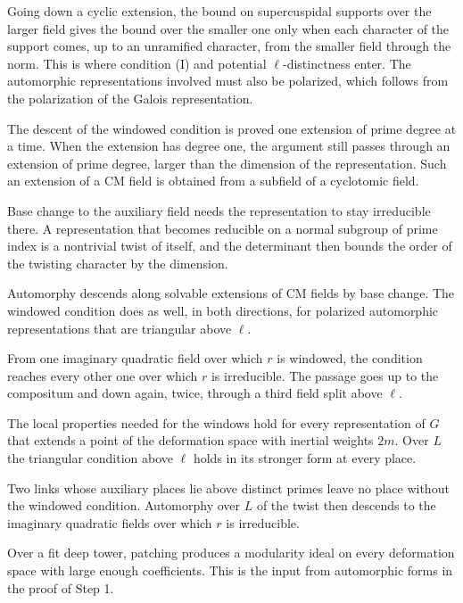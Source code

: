 Going down a cyclic extension, the bound on supercuspidal supports over the larger field gives the bound over the smaller one only when each character of the support comes, up to an unramified character, from the smaller field through the norm. This is where condition (I) and potential $\ell$-distinctness enter. The automorphic representations involved must also be polarized, which follows from the polarization of the Galois representation.

The descent of the windowed condition is proved one extension of prime degree at a time. When the extension has degree one, the argument still passes through an extension of prime degree, larger than the dimension of the representation. Such an extension of a CM field is obtained from a subfield of a cyclotomic field.

Base change to the auxiliary field needs the representation to stay irreducible there. A representation that becomes reducible on a normal subgroup of prime index is a nontrivial twist of itself, and the determinant then bounds the order of the twisting character by the dimension.

Automorphy descends along solvable extensions of CM fields by base change. The windowed condition does as well, in both directions, for polarized automorphic representations that are triangular above $\ell$.

From one imaginary quadratic field over which $r$ is windowed, the condition reaches every other one over which $r$ is irreducible. The passage goes up to the compositum and down again, twice, through a third field split above $\ell$.

The local properties needed for the windows hold for every representation of $G$ that extends a point of the deformation space with inertial weights $2m$. Over $L$ the triangular condition above $\ell$ holds in its stronger form at every place.

Two links whose auxiliary places lie above distinct primes leave no place without the windowed condition. Automorphy over $L$ of the twist then descends to the imaginary quadratic fields over which $r$ is irreducible.

Over a fit deep tower, patching produces a modularity ideal on every deformation space with large enough coefficients. This is the input from automorphic forms in the proof of Step 1.

